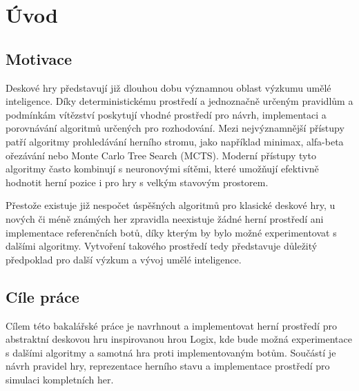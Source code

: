 

\chapter{Úvod}

\section*{Motivace}

Deskové hry představují již dlouhou dobu významnou oblast výzkumu umělé inteligence.
Díky deterministickému prostředí a jednoznačně určeným pravidlům a podmínkám vítězství 
poskytují vhodné prostředí pro návrh, implementaci a porovnávání algoritmů určených 
pro rozhodování. Mezi nejvýznamnější přístupy patří algoritmy prohledávání herního stromu,
jako například minimax, alfa-beta ořezávání nebo Monte Carlo Tree Search (MCTS).
Moderní přístupy tyto algoritmy často kombinují s neuronovými sítěmi, které umožňují efektivně
hodnotit herní pozice i pro hry s velkým stavovým prostorem.

Přestože existuje již nespočet úspěšných algoritmů pro klasické deskové hry, u nových či méně známých her 
zpravidla neexistuje žádné herní prostředí ani implementace referenčních botů, díky kterým by bylo možné experimentovat 
s dalšími algoritmy. Vytvoření takového prostředí tedy představuje důležitý předpoklad pro další výzkum a vývoj 
umělé inteligence. 

\section*{Cíle práce}

Cílem této bakalářské práce je navrhnout a implementovat herní prostředí pro abstraktní deskovou hru inspirovanou hrou Logix,
kde bude možná experimentace s dalšími algoritmy a samotná hra proti implementovaným botům. Součástí je návrh pravidel hry, 
reprezentace herního stavu a implementace prostředí pro simulaci kompletních her.

